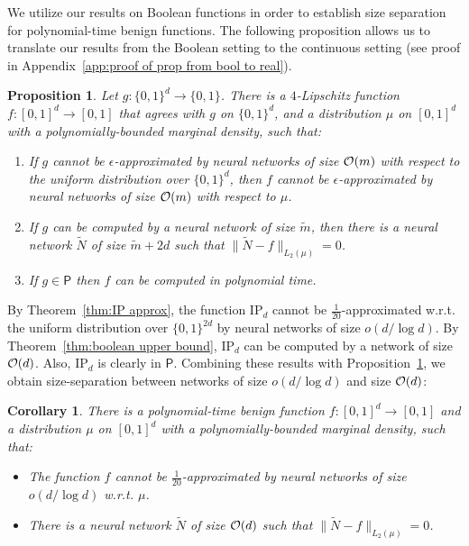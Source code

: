 \documentclass[11pt]{article}
\newtheorem{proposition}{Proposition}[section]
\newtheorem{corollary}{Corollary}[section]
\newcommand{\co}{{\cal O}}
\newcommand{\snorm}[1]{\|#1\|} %
\newcommand{\Ptime}{\textsf{P}}
\begin{document}
We utilize our results on Boolean functions in order to establish size separation for polynomial-time benign functions.
%
The following proposition allows us to 
translate our results from the Boolean setting to the 
continuous setting (see proof in Appendix~\ref{app:proof of prop from bool to real}).

\begin{proposition}
\label{prop:from bool to real}
	Let $g:\{0,1\}^d \rightarrow \{0,1\}$. There is a $4$-Lipschitz function $f:[0,1]^d \rightarrow [0,1]$ that agrees with $g$ on $\{0,1\}^d$, and a distribution $\mu$ on $[0,1]^d$ with a polynomially-bounded marginal density, such that:
	\begin{enumerate}
		\item If $g$ cannot be $\epsilon$-approximated by neural networks of size $\co(m)$ with respect to the uniform distribution over $\{0,1\}^d$, then $f$ cannot be $\epsilon$-approximated by neural networks of size $\co(m)$ with respect to $\mu$.
		\item If $g$ can be computed by a neural network of size $\tilde{m}$, then there is a neural network $\tilde{N}$ of size $\tilde{m} + 2d$ such that 
		$\snorm{\tilde{N}-f}_{L_2(\mu)}=0$.
		\item If $g \in \Ptime$ then $f$ can be computed in polynomial time.
	\end{enumerate}
\end{proposition}

By Theorem~\ref{thm:IP approx}, the function $\text{IP}_d$ cannot be $\frac{1}{20}$-approximated w.r.t. the uniform distribution over $\{0,1\}^{2d}$ by neural networks of size $o(d/\log d)$. 
By Theorem~\ref{thm:boolean upper bound}, $\text{IP}_d$ can be computed by a network of size $\co(d)$. Also, $\text{IP}_d$ is clearly in $\Ptime$. Combining these results with Proposition~\ref{prop:from bool to real}, we obtain size-separation between networks of size $o(d/\log d)$ and size $\co(d)$:
\begin{corollary}
\label{cor:separation benign}
	There is a polynomial-time benign function $f:[0,1]^d \rightarrow [0,1]$ and a distribution $\mu$ on $[0,1]^d$ with a polynomially-bounded marginal density, such that:
	\begin{itemize}
		\item The function $f$ cannot be $\frac{1}{20}$-approximated by neural networks of size $o(d/\log d)$ w.r.t. $\mu$.
		\item There is a neural network $\tilde{N}$ of size $\co(d)$ such that $\snorm{\tilde{N}-f}_{L_2(\mu)}=0$. 
	\end{itemize} 
\end{corollary}
\end{document}
